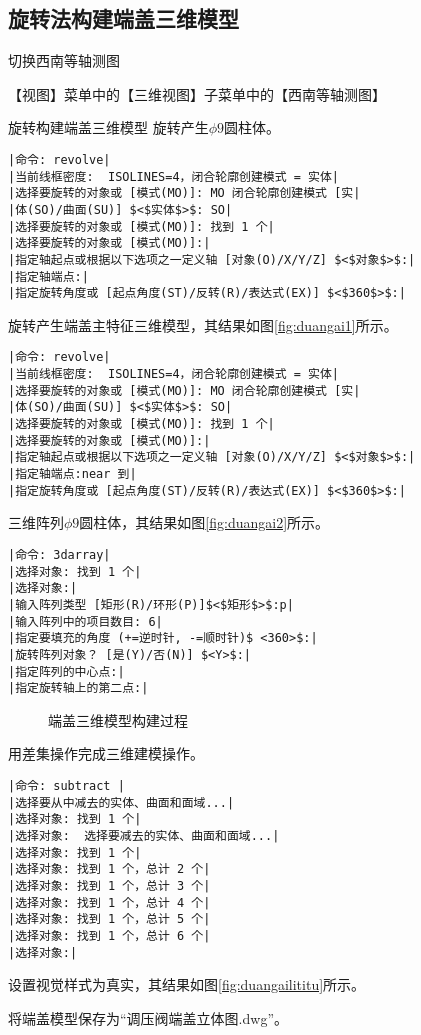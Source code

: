 \subsection{旋转法构建端盖三维模型}
\begin{procedure}
\item 切换西南等轴测图

【视图】菜单中的【三维视图】子菜单中的【西南等轴测图】
\item 旋转构建端盖三维模型
旋转产生$\phi 9$圆柱体。
\begin{lstlisting}
|命令: revolve|
|当前线框密度:  ISOLINES=4，闭合轮廓创建模式 = 实体|
|选择要旋转的对象或 [模式(MO)]: MO 闭合轮廓创建模式 [实|
|体(SO)/曲面(SU)] $<$实体$>$: SO|
|选择要旋转的对象或 [模式(MO)]: 找到 1 个|
|选择要旋转的对象或 [模式(MO)]:|
|指定轴起点或根据以下选项之一定义轴 [对象(O)/X/Y/Z] $<$对象$>$:|
|指定轴端点:|
|指定旋转角度或 [起点角度(ST)/反转(R)/表达式(EX)] $<$360$>$:|
\end{lstlisting}
旋转产生端盖主特征三维模型，其结果如图\ref{fig:duangai1}所示。

\begin{lstlisting}
|命令: revolve|
|当前线框密度:  ISOLINES=4，闭合轮廓创建模式 = 实体|
|选择要旋转的对象或 [模式(MO)]: MO 闭合轮廓创建模式 [实|
|体(SO)/曲面(SU)] $<$实体$>$: SO|
|选择要旋转的对象或 [模式(MO)]: 找到 1 个|
|选择要旋转的对象或 [模式(MO)]:|
|指定轴起点或根据以下选项之一定义轴 [对象(O)/X/Y/Z] $<$对象$>$:|
|指定轴端点:near 到|
|指定旋转角度或 [起点角度(ST)/反转(R)/表达式(EX)] $<$360$>$:|
\end{lstlisting}
\item 三维阵列$\phi 9$圆柱体，其结果如图\ref{fig:duangai2}所示。
\begin{lstlisting}
|命令: 3darray|
|选择对象: 找到 1 个|
|选择对象:|
|输入阵列类型 [矩形(R)/环形(P)]$<$矩形$>$:p|
|输入阵列中的项目数目: 6|
|指定要填充的角度 (+=逆时针, -=顺时针)$ <360>$:|
|旋转阵列对象？ [是(Y)/否(N)] $<Y>$:|
|指定阵列的中心点:|
|指定旋转轴上的第二点:|
\end{lstlisting}
\begin{figure}[htbp]
\centering
{}\hspace{30pt}
\hspace{30pt}
\caption{端盖三维模型构建过程}
\end{figure}
\item 用差集操作完成三维建模操作。
\begin{lstlisting}
|命令: subtract |
|选择要从中减去的实体、曲面和面域...|
|选择对象: 找到 1 个|
|选择对象:  选择要减去的实体、曲面和面域...|
|选择对象: 找到 1 个|
|选择对象: 找到 1 个，总计 2 个|
|选择对象: 找到 1 个，总计 3 个|
|选择对象: 找到 1 个，总计 4 个|
|选择对象: 找到 1 个，总计 5 个|
|选择对象: 找到 1 个，总计 6 个|
|选择对象:|
\end{lstlisting}
\item 设置视觉样式为真实，其结果如图\ref{fig:duangailititu}所示。
\item 将端盖模型保存为“调压阀端盖立体图.dwg”。
\end{procedure}
\endinput